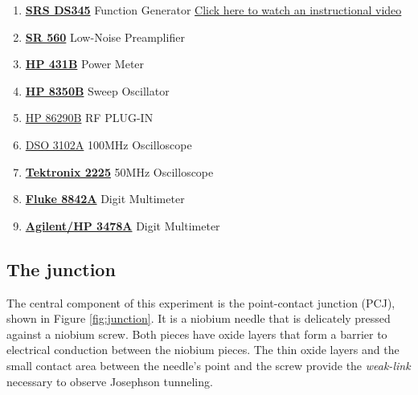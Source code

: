 \documentclass{../lab}
\begin{document}
\begin{enumerate}
    \item \href{http://physics111.lib.berkeley.edu/Physics111/Equipment_Manuals/JOS/DS345m.pdf}{\textbf{SRS DS345}} Function Generator \href{https://youtu.be/PrM8DHFOFS0}{Click here to watch an instructional video}

    \item \href{http://physics111.lib.berkeley.edu/Physics111/Equipment_Manuals/JOS/OCR\%20SR560\%20low\%20noise\%20preamp.pdf}{\textbf{SR 560}} Low-Noise Preamplifier

    \item \href{http://physics111.lib.berkeley.edu/Physics111/Reprints/JOS/HP\%20431B\%20power\%20meter\%20with\%20schem.pdf}{\textbf{HP 431B}} Power Meter

    \item \href{http://physics111.lib.berkeley.edu/Physics111/Reprints/JOS/HP_8350B_Operation_Manual.pdf}{\textbf{HP 8350B}} Sweep Oscillator

    \item \href{http://physics111.lib.berkeley.edu/Physics111/Reprints/JOS/HP_8350B_Operation_Manual.pdf}{HP 86290B} RF PLUG-IN

    \item \href{http://physics111.lib.berkeley.edu/Physics111/Reprints/JOS/HP_8350B_Operation_Manual.pdf}{DSO 3102A} 100MHz Oscilloscope
    
    \item \href{http://physics111.lib.berkeley.edu/Physics111/Equipment_Manuals/JOS/01-Tektronix_2225_scope.pdf}{\textbf{Tektronix 2225}} 50MHz Oscilloscope
    
    \item \href{http://physics111.lib.berkeley.edu/Physics111/Equipment_Manuals/JOS/fluke_8842a.pdf}{\textbf{Fluke 8842A}} Digit Multimeter
    
    \item \href{http://physics111.lib.berkeley.edu/Physics111/Equipment_Manuals/JOS/hp3478a\%20multimeter.pdf}{\textbf{Agilent/HP 3478A}} Digit Multimeter

\end{enumerate}

\subsection{The junction}

The central component of this experiment is the point-contact junction (PCJ), shown in Figure \ref{fig:junction}. It is a niobium needle that is delicately pressed against a niobium screw. Both pieces have oxide layers that form a barrier to electrical conduction between the niobium pieces. The thin oxide layers and the small contact area between the needle's point and the screw provide the \emph{weak-link} necessary to observe Josephson tunneling.
\end{document}
